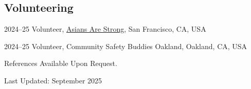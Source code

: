 \documentclass[11pt,letterpaper]{article}
\begin{document}
\subsection{Volunteering}
\begin{tablist}
  \item[2024–25] \tab{}Volunteer, \href{https://asiansarestrong.org/}{Asians Are Strong}, San Francisco, CA, USA
  \item[2024–25] \tab{}Volunteer, Community Safety Buddies Oakland, Oakland, CA, USA
\end{tablist}

\vspace{1.0\baselineskip}
References Available Upon Request.\par\vspace{.2\baselineskip}
{\footnotesize Last Updated: September 2025}
\end{document}
